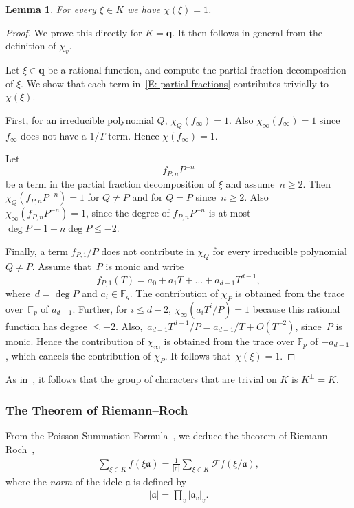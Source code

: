 \documentclass{amsart}
\newcommand\F{\mathbb{F}}
\newcommand\q{\mathbf{q}}
\newcommand\Fo{\mathcal{F}}
\newcommand\gota{\mathfrak{a}}	\newcommand\gotb{\mathfrak{b}}
\newtheorem{lemma}[theorem]{Lemma}
\theoremstyle{definition}\newtheorem{definition}[theorem]{Definition}
\theoremstyle{remark}\newtheorem{remark}[theorem]{Remark}
\numberwithin{equation}{section}
\begin{document}
\begin{lemma}
For every\/ $\xi\in K$ we have $\chi(\xi)=1$.
\end{lemma}

\begin{proof}
We prove this directly for $K=\q$.
It then follows in general from the definition of $\chi_v$.

Let $\xi\in\q$ be a rational function,
and compute the partial fraction decomposition of $\xi$.
We show that each term in~\eqref{E: partial fractions} contributes trivially to~$\chi(\xi)$.

First,
for an irreducible polynomial $Q$,
$\chi_Q(f_\infty)=1$.
Also $\chi_\infty(f_\infty)=1$ since $f_\infty$ does not have a $1/T$-term.
Hence $\chi(f_\infty)=1$.

Let
$$
f_{P,n}P^{-n}
$$
 be a term in the partial fraction decomposition of $\xi$ and assume~$n\geq2$.
Then $\chi_Q(f_{P,n}P^{-n})=1$ for $Q\neq P$ and for $Q=P$ since~$n\geq2$.
Also \mbox{$\chi_\infty(f_{P,n}P^{-n})=1$},
since the degree of $f_{P,n}P^{-n}$ is at most $\deg P-1-n\deg P\leq-2$.

Finally,
a term $f_{P,1}/P$ does not contribute in $\chi_Q$ for every irreducible polynomial $Q\neq P$.
Assume that~$P$ is monic and write
$$
f_{P,1}(T)=a_0+a_1T+\dots+a_{d-1}T^{d-1},
$$
where~$d=\deg P$ and $a_i\in\F_q$.
The contribution of $\chi_P$ is obtained from the trace over~$\F_p$ of $a_{d-1}$.
Further,
for $i\leq d-2$,
 $\chi_\infty(a_iT^i/P)=1$ because this rational function has degree $\leq-2$.
Also,~\mbox{$a_{d-1}T^{d-1}/P=a_{d-1}/T+O(T^{-2})$},
since~$P$ is monic.
Hence the contribution of $\chi_\infty$ is obtained from the trace over $\F_p$ of $-a_{d-1}$,
which cancels the contribution of $\chi_P$.
It follows that~\mbox{$\chi(\xi)=1$}.
\end{proof}

As in~\cite[Theorem~4.1.4]{Tate},
it follows that the group of characters that are trivial on $K$ is $K^\perp=K$.

\subsubsection{The Theorem of Riemann--Roch}
\label{S: RR}

From the Poisson Summation Formula~\cite[Lemma~4.2.4]{Tate},
we deduce the theorem of Riemann--Roch~\cite[Theorem~4.2.1]{Tate},
\begin{gather*}
\sum_{\xi\in K}f(\xi\gota)=\frac1{|\gota|}\sum_{\xi\in K}\Fo f(\xi/\gota),
\end{gather*}
where the {\em norm\/} of the idele $\gota$ is defined by
\begin{gather}\label{E:norm}
|\gota|=\prod_v|\gota_v|_v.
\end{gather}
\end{document}
